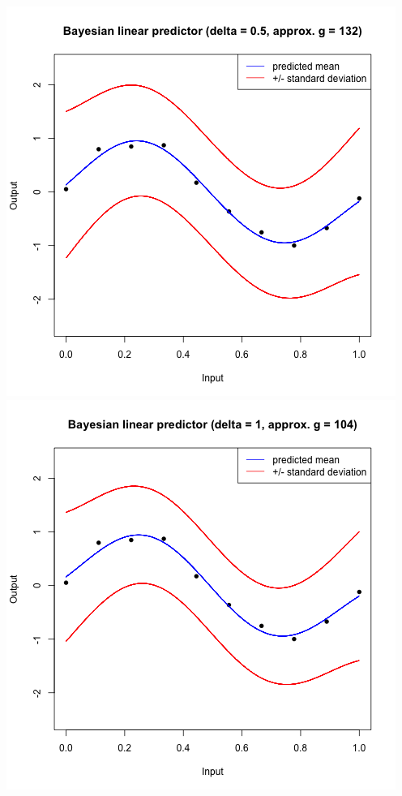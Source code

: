 \documentclass[a4paper, 11pt]{article}
\begin{document}
\begin{center}
\includegraphics[scale=0.6]{ps3F_plot3.png}
\includegraphics[scale=0.6]{ps3F_plot4.png}

\end{center}
\end{document}
